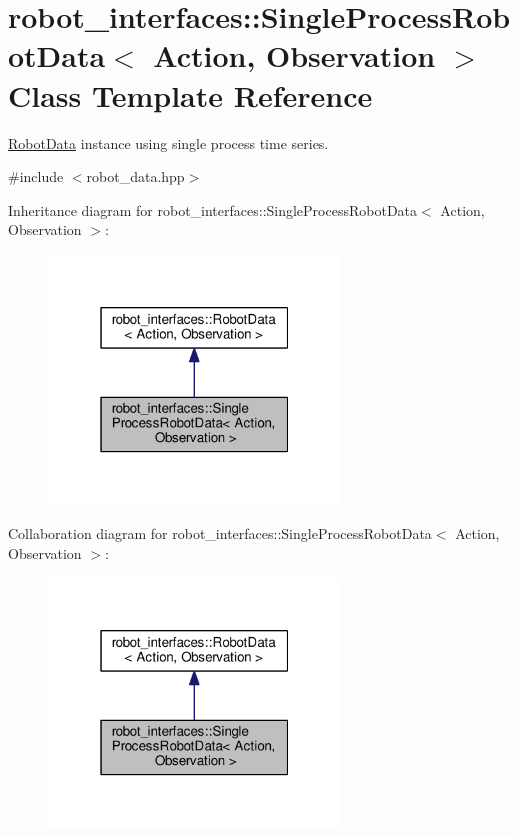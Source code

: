 \hypertarget{classrobot__interfaces_1_1SingleProcessRobotData}{}\section{robot\+\_\+interfaces\+:\+:Single\+Process\+Robot\+Data$<$ Action, Observation $>$ Class Template Reference}
\label{classrobot__interfaces_1_1SingleProcessRobotData}


\hyperlink{classrobot__interfaces_1_1RobotData}{Robot\+Data} instance using single process time series.  




{\ttfamily \#include $<$robot\+\_\+data.\+hpp$>$}



Inheritance diagram for robot\+\_\+interfaces\+:\+:Single\+Process\+Robot\+Data$<$ Action, Observation $>$\+:
\nopagebreak
\begin{figure}[H]
\begin{center}
\leavevmode
\includegraphics[width=220pt]{classrobot__interfaces_1_1SingleProcessRobotData__inherit__graph}
\end{center}
\end{figure}


Collaboration diagram for robot\+\_\+interfaces\+:\+:Single\+Process\+Robot\+Data$<$ Action, Observation $>$\+:
\nopagebreak
\begin{figure}[H]
\begin{center}
\leavevmode
\includegraphics[width=220pt]{classrobot__interfaces_1_1SingleProcessRobotData__coll__graph}
\end{center}
\end{figure}
